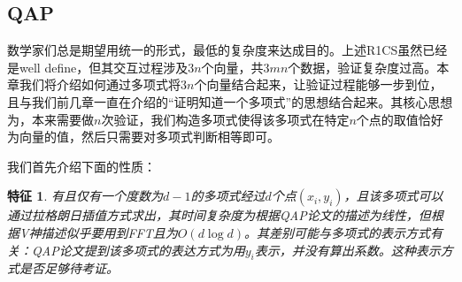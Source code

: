 \documentclass[12pt]{article}
\newtheorem{property}{特征}
\begin{document}
\subsection{QAP}
\label{sec:QAP}
数学家们总是期望用统一的形式，最低的复杂度来达成目的。上述R1CS虽然已经是well define，但其交互过程涉及$3n$个向量，共$3mn$个数据，验证复杂度过高。本章我们将介绍如何通过多项式将$3n$个向量结合起来，让验证过程能够一步到位，且与我们前几章一直在介绍的“证明知道一个多项式”的思想结合起来。其核心思想为，本来需要做$n$次验证，我们构造多项式使得该多项式在特定$n$个点的取值恰好为向量的值，然后只需要对多项式判断相等即可。

我们首先介绍下面的性质：
\begin{property}
	有且仅有一个度数为$d-1$的多项式经过$d$个点$(x_i,y_i)$，且该多项式可以通过拉格朗日插值方式求出，其时间复杂度为{\color{red}根据QAP论文的描述为线性，但根据V神描述似乎要用到FFT且为$O(d\log d)$。其差别可能与多项式的表示方式有关：QAP论文提到该多项式的表达方式为用$y_i$表示，并没有算出系数。这种表示方式是否足够待考证。}
\end{property}
\end{document}
